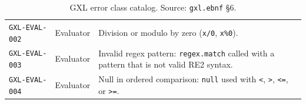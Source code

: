 \begin{table}[ht]
\begin{tabular}{p{3.0cm}p{3.0cm}p{7.0cm}}
\texttt{GXL-EVAL-002} & Evaluator & Division or modulo by zero (\texttt{x/0}, \texttt{x\%0}). \\
\texttt{GXL-EVAL-003} & Evaluator & Invalid regex pattern: \texttt{regex.match} called with a pattern that is not valid RE2 syntax. \\
\texttt{GXL-EVAL-004} & Evaluator & Null in ordered comparison: \texttt{null} used with \texttt{<}, \texttt{>}, \texttt{<=}, or \texttt{>=}. \\
\hline
\end{tabular}
\caption{GXL error class catalog.
  Source: \texttt{gxl.ebnf} \S6.}
\label{tab:gxl-errors}
\end{table}

